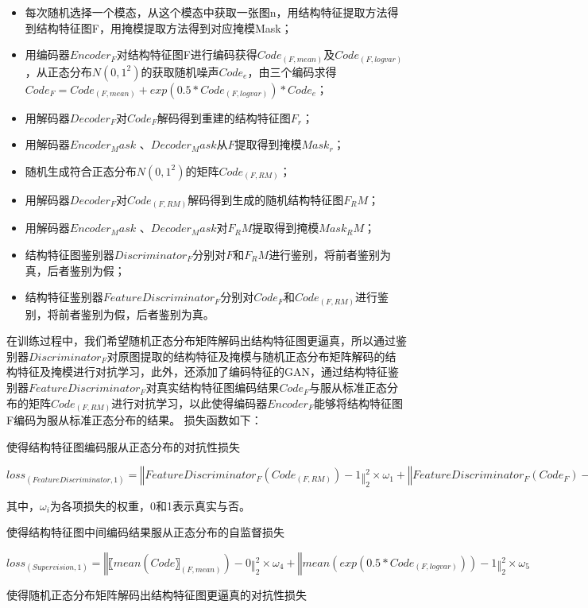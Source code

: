 \documentclass[letterpaper]{article} %
\begin{document}
\begin{itemize}
	\item 每次随机选择一个模态，从这个模态中获取一张图n，用结构特征提取方法得到结构特征图F，用掩模提取方法得到对应掩模Mask；
	\item 用编码器$Encoder_F$对结构特征图F进行编码获得$Code_(F,mean)$及$Code_(F,logvar)$，从正态分布$N(0,1^2)$的获取随机噪声$Code_e$，由三个编码求得$Code_F=Code_(F,mean)+exp(0.5*Code_(F,logvar) )*Code_e$；
	\item 用解码器$Decoder_F$对$Code_F$解码得到重建的结构特征图$F_r$；
	\item 用解码器$Encoder_Mask$ 、$Decoder_Mask$从$F$提取得到掩模$Mask_r$；
	\item 随机生成符合正态分布$N(0,1^2)$的矩阵$Code_(F,RM)$；
	\item 用解码器$Decoder_F$对$Code_(F,RM)$解码得到生成的随机结构特征图$F_RM$；
	\item 用解码器$Encoder_Mask$ 、$Decoder_Mask$对$F_RM$提取得到掩模$Mask_RM$；
	\item 结构特征图鉴别器$Discriminator_F$分别对$F$和$F_RM$进行鉴别，将前者鉴别为真，后者鉴别为假；
	\item 结构特征鉴别器$FeatureDiscriminator_F$分别对$Code_F$和$Code_(F,RM)$进行鉴别，将前者鉴别为假，后者鉴别为真。
\end{itemize}

在训练过程中，我们希望随机正态分布矩阵解码出结构特征图更逼真，所以通过鉴别器$Discriminator_F$对原图提取的结构特征及掩模与随机正态分布矩阵解码的结构特征及掩模进行对抗学习，此外，还添加了编码特征的GAN，通过结构特征鉴别器$FeatureDiscriminator_F$对真实结构特征图编码结果$Code_F$与服从标准正态分布的矩阵$Code_(F,RM)$进行对抗学习，以此使得编码器$Encoder_F$能够将结构特征图F编码为服从标准正态分布的结果。
损失函数如下：

使得结构特征图编码服从正态分布的对抗性损失

$
loss_(FeatureDiscriminator,1)=‖FeatureDiscriminator_F (Code_(F,RM) )-1‖_2^2×ω_1  +‖FeatureDiscriminator_F (Code_F )-0‖_2^2×ω_2
loss_(Generator,1)=‖FeatureDiscriminator_F (Code_F )-1‖_2^2×ω_3  $

其中，$ω_i$为各项损失的权重，0和1表示真实与否。

使得结构特征图中间编码结果服从正态分布的自监督损失

$loss_(Supervision,1)=‖〖mean(Code〗_(F,mean))-0‖_2^2×ω_4+ ‖mean(exp(0.5*Code_(F,logvar) ))-1‖_2^2×ω_5$

使得随机正态分布矩阵解码出结构特征图更逼真的对抗性损失
\end{document}
